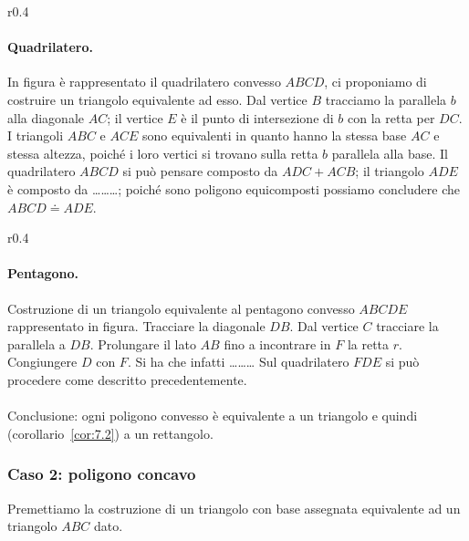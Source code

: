 \begin{wrapfigure}{r}{0.4\textwidth}
	\centering
\end{wrapfigure}
\paragraph{Quadrilatero.}
In figura è rappresentato il quadrilatero convesso $ABCD$, ci proponiamo di costruire un triangolo equivalente ad esso. Dal vertice $B$ tracciamo la parallela $b$ alla diagonale $AC$; il vertice $E$ è il punto di intersezione di $b$ con la retta per $DC$. I triangoli $ABC$ e $ACE$ sono equivalenti in quanto hanno la stessa base $AC$ e stessa altezza, poiché i loro vertici si trovano sulla retta $b$ parallela alla base. Il quadrilatero $ABCD$ si può pensare composto da $ADC + ACB$; il triangolo $ADE$ è composto da \ldots\ldots\ldots{}; poiché sono poligono equicomposti possiamo concludere che $ABCD\doteq ADE$.

\begin{wrapfigure}{r}{0.4\textwidth}
	\centering
\end{wrapfigure}
\paragraph{Pentagono.}
Costruzione di un triangolo equivalente al pentagono convesso $ABCDE$ rappresentato in figura.
Tracciare la diagonale $DB$.
Dal vertice $C$ tracciare la parallela a $DB$.
Prolungare il lato $AB$ fino a incontrare in $F$ la retta $r$.
Congiungere $D$ con $F$.
Si ha che  infatti \ldots\ldots\ldots{} 
Sul quadrilatero $FDE$ si può procedere come descritto precedentemente.

\paragraph*{}
Conclusione: ogni poligono convesso è equivalente a un triangolo e quindi (corollario~\ref{cor:7.2}) a un rettangolo.

\subsubsection{Caso 2: poligono concavo}

Premettiamo la costruzione di un triangolo con base assegnata equivalente ad un triangolo $ABC$ dato.

